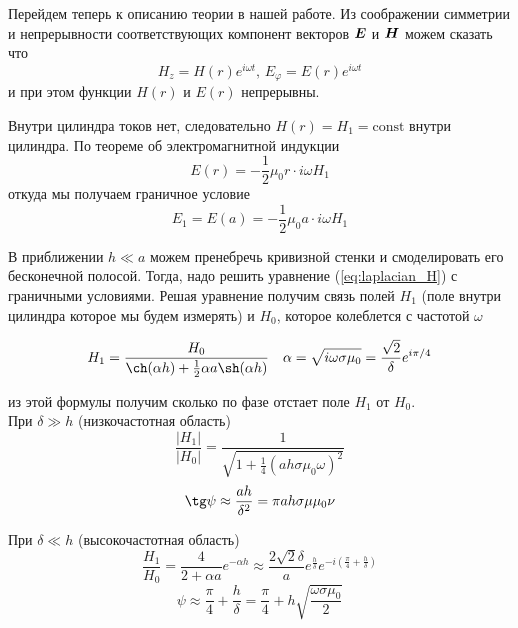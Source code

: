 \documentclass[a4paper,12pt]{article}
\begin{document}
Перейдем теперь к описанию теории в нашей работе. Из соображении симметрии и 
непрерывности соответствующих компонент векторов $\vb*{E}$ и $\vb*{H}$ можем сказать что
\begin{equation}
    H_z = H(r)e^{i\omega t} \text{, } E_\varphi = E(r)e^{i\omega t}
\end{equation}
и при этом функции $H(r)$ и $E(r)$ непрерывны.

Внутри цилиндра токов нет, следовательно $H(r)=H_1=\text{const}$ внутри цилиндра.
По теореме об электромагнитной индукции
\begin{equation}
    E(r) = -\frac{1}{2}\mu_0 r \cdot i \omega H_1
\end{equation}
откуда мы получаем граничное условие
\begin{equation}
    E_1=E(a)= -\frac{1}{2}\mu_0 a \cdot i \omega H_1
    \label{eq:granichnoe_uslovie_E}
\end{equation}

В приближении $h \ll a$ можем пренебречь кривизной стенки и смоделировать 
его бесконечной полосой. Тогда, надо решить уравнение (\ref{eq:laplacian_H})
с граничными условиями. Решая уравнение получим связь полей $H_1$ 
(поле внутри цилиндра которое мы будем измерять) и $H_0$, которое колеблется с частотой
$\omega$

\begin{equation}
    H_1 = \frac{H_0}{\ch(\alpha h) + \frac{1}{2} \alpha a \sh(\alpha h)} 
    \text{\ \ \ }
    \alpha = \sqrt{i\omega \sigma \mu_0} = \frac{\sqrt{2}}{\delta}e^{i\pi/4}
    \label{eq:svyaz_poley}
\end{equation}

из этой формулы получим сколько по фазе отстает поле $H_1$ от $H_0$.\\
При $\delta \gg h$ (низкочастотная область)
\begin{equation}
    \dfrac{|H_1|}{|H_0|} = \dfrac{1}{\sqrt{1+ \frac{1}{4} (a h \sigma \mu_0 \omega )^2 }}
    \label{eq:H_low_freq}
\end{equation}
\begin{equation}
    \tg \psi \approx \frac{ah}{\delta^2} = \pi a h \sigma \mu \mu_0 \nu
    \label{eq:faza_low_freq}
\end{equation}

При $\delta \ll h$
(высокочастотная область)
\begin{equation}
    \dfrac{H_1}{H_0} = \dfrac{4}{2+\alpha a}e^{-\alpha h} \approx \dfrac{2 \sqrt{2} \delta}{a} e^{\frac{h}{\delta}}e^{-i \left( \frac{\pi}{4} + \frac{h}{\delta}\right)}
\end{equation}
\begin{equation}
    \psi \approx \frac{\pi}{4} + \frac{h}{\delta} = 
    \frac{\pi}{4} + h \sqrt{\frac{\omega \sigma \mu_0}{2}}
    \label{eq:faza_high_freq}
\end{equation}
\end{document}
